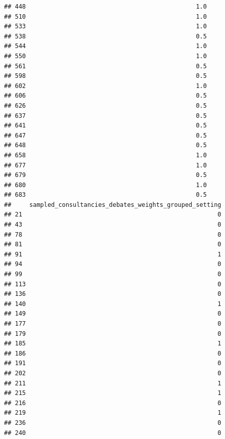 \documentclass[
]{article}
\begin{document}
\begin{verbatim}
## 448                                               1.0
## 510                                               1.0
## 533                                               1.0
## 538                                               0.5
## 544                                               1.0
## 550                                               1.0
## 561                                               0.5
## 598                                               0.5
## 602                                               1.0
## 606                                               0.5
## 626                                               0.5
## 637                                               0.5
## 641                                               0.5
## 647                                               0.5
## 648                                               0.5
## 658                                               1.0
## 677                                               1.0
## 679                                               0.5
## 680                                               1.0
## 683                                               0.5
##     sampled_consultancies_debates_weights_grouped_setting
## 21                                                      0
## 43                                                      0
## 78                                                      0
## 81                                                      0
## 91                                                      1
## 94                                                      0
## 99                                                      0
## 113                                                     0
## 136                                                     0
## 140                                                     1
## 149                                                     0
## 177                                                     0
## 179                                                     0
## 185                                                     1
## 186                                                     0
## 191                                                     0
## 202                                                     0
## 211                                                     1
## 215                                                     1
## 216                                                     0
## 219                                                     1
## 236                                                     0
## 240                                                     0

\end{verbatim}
\end{document}
